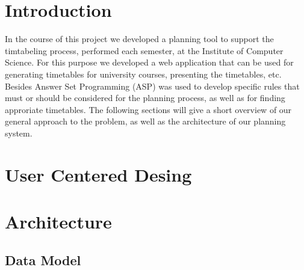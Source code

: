\documentclass[12pt]{article} %
\begin{document}

\tableofcontents %

\newpage %


\section{Introduction} 

In the course of this project we developed a planning tool to support the timtabeling process, performed each semester, at the Institute of Computer Science.
For this purpose we developed a web application that can be used for generating timetables for university courses, presenting the timetables, etc.
Besides Answer Set Programming (ASP) \cite{ASP} was used to develop specific rules that must or should be considered for the planning process, as well as for finding approriate timetables. 
The following sections will give a short overview of our general approach to the problem, as well as the architecture of our planning system.


\section{User Centered Desing} 





\section{Architecture} %

\subsection{Data Model} 
\end{document}
